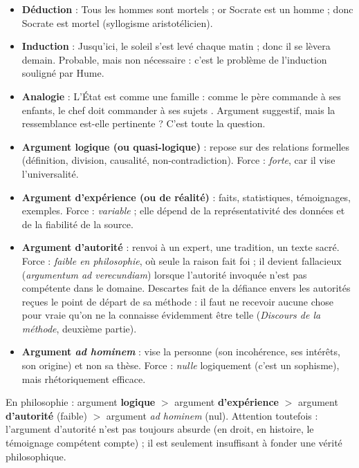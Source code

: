 \documentclass[11pt]{article}
\newcounter{popsec}
\newcounter{popsub}
\newcommand{\courssub}[1]{%
  \stepcounter{popsub}%
  \par\vspace{9pt}\noindent{\popxbold\fontsize{11.5}{13}\selectfont\color{popink}{\color{poporange}\thepopsec.\thepopsub}\hspace{6pt}#1}\par\nopagebreak\vspace{4pt}
}
\begin{document}
\begin{exemplebox}
\begin{itemize}
  \item \textbf{Déduction} : Tous les hommes sont mortels ; or Socrate est un homme ; donc Socrate est mortel (syllogisme aristotélicien).
  \item \textbf{Induction} : Jusqu'ici, le soleil s'est levé chaque matin ; donc il se lèvera demain. Probable, mais non nécessaire : c'est le problème de l'induction souligné par Hume.
  \item \textbf{Analogie} : \guillemotleft L'État est comme une famille : comme le père commande à ses enfants, le chef doit commander à ses sujets \guillemotright. Argument suggestif, mais la ressemblance est-elle pertinente ? C'est toute la question.
\end{itemize}
\end{exemplebox}

\courssub{Types d'arguments et force probante}

\begin{itemize}
  \item \textbf{Argument logique (ou quasi-logique)} : repose sur des relations formelles (définition, division, causalité, non-contradiction). Force : \emph{forte}, car il vise l'universalité.
  \item \textbf{Argument d'expérience (ou de réalité)} : faits, statistiques, témoignages, exemples. Force : \emph{variable} ; elle dépend de la représentativité des données et de la fiabilité de la source.
  \item \textbf{Argument d'autorité} : renvoi à un expert, une tradition, un texte sacré. Force : \emph{faible en philosophie}, où seule la raison fait foi ; il devient fallacieux (\emph{argumentum ad verecundiam}) lorsque l'autorité invoquée n'est pas compétente dans le domaine. Descartes fait de la défiance envers les autorités reçues le point de départ de sa méthode : il faut ne recevoir aucune chose pour vraie qu'on ne la connaisse évidemment être telle (\emph{Discours de la méthode}, deuxième partie).
  \item \textbf{Argument \emph{ad hominem}} : vise la personne (son incohérence, ses intérêts, son origine) et non sa thèse. Force : \emph{nulle} logiquement (c'est un sophisme), mais rhétoriquement efficace.
\end{itemize}

\begin{attention}
En philosophie : argument \textbf{logique} $>$ argument \textbf{d'expérience} $>$ argument \textbf{d'autorité} (faible) $>$ argument \emph{ad hominem} (nul). Attention toutefois : l'argument d'autorité n'est pas toujours absurde (en droit, en histoire, le témoignage compétent compte) ; il est seulement insuffisant à fonder une vérité philosophique.
\end{attention}
\end{document}
